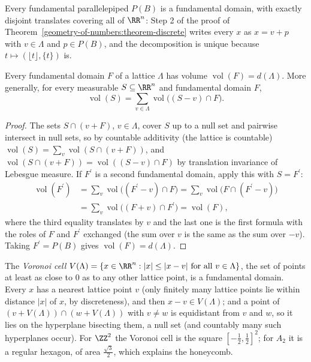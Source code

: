 Every fundamental parallelepiped $P(B)$ is a fundamental domain, with exactly disjoint translates covering all of $\RR^n$: Step 2 of the proof of Theorem~\ref{geometry-of-numbers:theorem-discrete} writes
every $x$ as $x = v + p$ with $v \in \Lambda$ and $p \in P(B)$, and the decomposition is unique because $t \mapsto (\lfloor t \rfloor, \{t\})$ is.

\begin{proposition}\label{geometry-of-numbers:proposition-fundamental-domain}
Every fundamental domain $F$ of a lattice $\Lambda$ has volume $\operatorname{vol}(F) = d(\Lambda)$. More generally, for every measurable $S \subseteq \RR^n$ and fundamental domain $F$,
\[
\operatorname{vol}(S) = \sum_{v \in \Lambda}\operatorname{vol}\bigl((S - v) \cap F\bigr).
\]
\end{proposition}

\begin{proof}
The sets $S \cap (v + F)$, $v \in \Lambda$, cover $S$ up to a null set and pairwise intersect in null sets, so by countable additivity (the lattice is countable)
$\operatorname{vol}(S) = \sum_v\operatorname{vol}(S \cap (v + F))$, and $\operatorname{vol}(S \cap (v + F)) = \operatorname{vol}((S - v) \cap F)$ by translation invariance of Lebesgue measure. If $F^{\prime}$ is a
second fundamental domain, apply this with $S = F^{\prime}$:
\[
\begin{aligned}
\operatorname{vol}(F^{\prime}) &= \sum_v\operatorname{vol}\bigl((F^{\prime} - v) \cap F\bigr) = \sum_v\operatorname{vol}\bigl(F \cap (F^{\prime} - v)\bigr)\\
&= \sum_v\operatorname{vol}\bigl((F + v) \cap F^{\prime}\bigr) = \operatorname{vol}(F),
\end{aligned}
\]
where the third equality translates by $v$ and the last one is the first formula with the roles of $F$ and $F^{\prime}$ exchanged (the sum over $v$ is the same as the sum over $-v$). Taking
$F^{\prime} = P(B)$ gives $\operatorname{vol}(F) = d(\Lambda)$.
\end{proof}

\begin{example}\label{geometry-of-numbers:example-voronoi}
The \emph{Voronoi cell} $V(\Lambda) = \{x \in \RR^n : |x| \leq |x - v| \text{ for all } v \in \Lambda\}$, the set of points at least as close to $0$ as to any other lattice point, is a fundamental
domain. Every $x$ has a nearest lattice point $v$ (only finitely many lattice points lie within distance $|x|$ of $x$, by discreteness), and then $x - v \in V(\Lambda)$; and a point of
$(v + V(\Lambda)) \cap (w + V(\Lambda))$ with $v \neq w$ is equidistant from $v$ and $w$, so it lies on the hyperplane bisecting them, a null set (and countably many such hyperplanes occur). For
$\ZZ^2$ the Voronoi cell is the square $[-\frac12, \frac12]^2$; for $A_2$ it is a regular hexagon, of area $\frac{\sqrt3}{2}$, which explains the honeycomb.
\end{example}

